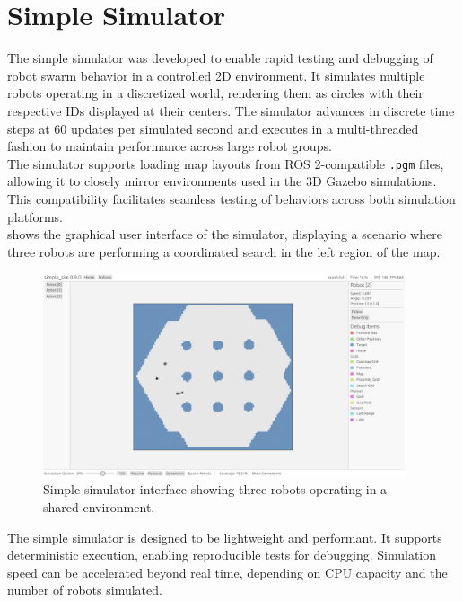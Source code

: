 \section{Simple Simulator}
\label{sec:simple-simulator}
The simple simulator was developed to enable rapid testing and debugging of robot swarm behavior in a controlled 2D environment. It simulates multiple robots operating in a discretized world, rendering them as circles with their respective IDs displayed at their centers. The simulator advances in discrete time steps at 60 updates per simulated second and executes in a multi-threaded fashion to maintain performance across large robot groups. \\

The simulator supports loading map layouts from ROS 2-compatible \texttt{.pgm} files, allowing it to closely mirror environments used in the 3D Gazebo simulations. This compatibility facilitates seamless testing of behaviors across both simulation platforms. \\

 shows the graphical user interface of the simulator, displaying a scenario where three robots are performing a coordinated search in the left region of the map.

\begin{figure}[H]
    \begin{center}
        \includegraphics[width=0.95\textwidth]{figures/screenshots/simple-sim-gui.png}
    \end{center}
    \caption{Simple simulator interface showing three robots operating in a shared environment.}
    \label{fig:simple-sim-interface}
\end{figure}

The simple simulator is designed to be lightweight and performant. It supports deterministic execution, enabling reproducible tests for debugging. Simulation speed can be accelerated beyond real time, depending on CPU capacity and the number of robots simulated. \\

